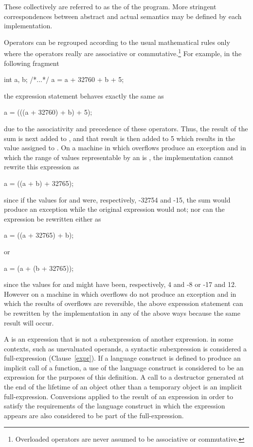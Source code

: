 These collectively are referred to as the
 of the program.
\enternote More stringent correspondences between abstract and actual
semantics may be defined by each implementation. \exitnote

\pnum
{}%
%
\enternote Operators can be regrouped according to the usual
mathematical rules only where the operators really are associative or
commutative.\footnote{Overloaded operators are never assumed to be associative or
commutative. }
For example, in the following fragment
\begin{codeblock}
int a, b;
/*...*/
a = a + 32760 + b + 5;
\end{codeblock}
the expression statement behaves exactly the same as
\begin{codeblock}
a = (((a + 32760) + b) + 5);
\end{codeblock}
due to the associativity and precedence of these operators. Thus, the
result of the sum  is next added to , and
that result is then added to 5 which results in the value assigned to
. On a machine in which overflows produce an exception and in
which the range of values representable by an  is
, the implementation cannot rewrite this
expression as
\begin{codeblock}
a = ((a + b) + 32765);
\end{codeblock}
since if the values for  and  were, respectively,
-32754 and -15, the sum  would produce an exception while
the original expression would not; nor can the expression be rewritten
either as
\begin{codeblock}
a = ((a + 32765) + b);
\end{codeblock}
or
\begin{codeblock}
a = (a + (b + 32765));
\end{codeblock}
since the values for  and  might have been,
respectively, 4 and -8 or -17 and 12. However on a machine in which
overflows do not produce an exception and in which the results of
overflows are reversible, the above expression statement can be
rewritten by the implementation in any of the above ways because the
same result will occur. \exitnote

\pnum
{}%
A  is an expression that is not a
subexpression of another expression.
\enternote
in some contexts, such as unevaluated operands, a syntactic
subexpression is considered a full-expression
(Clause~\ref{expr}).
\exitnote
If a language construct is defined
to produce an implicit call of a function, a use of the language
construct is considered to be an expression for the purposes of this
definition. A call to a destructor generated at the end of the lifetime
of an object other than a temporary object is an implicit
full-expression. Conversions applied to the result of an expression in
order to satisfy the requirements of the language construct in which the
expression appears are also considered to be part of the
full-expression.

